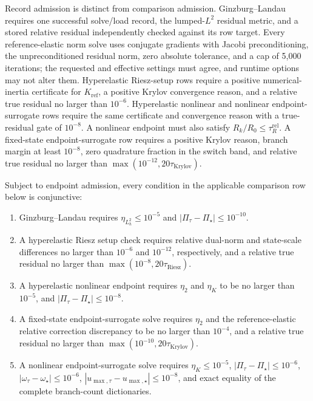 Record admission is distinct from comparison admission. Ginzburg--Landau
requires one successful solve/load record, the lumped-$L^2$ residual metric,
and a stored relative residual independently checked against its row target.
Every
reference-elastic norm solve uses conjugate gradients with Jacobi
preconditioning, the unpreconditioned residual norm, zero absolute tolerance,
and a cap of 5,000 iterations; the requested and effective settings must agree,
and runtime options may not alter them. Hyperelastic Riesz-setup rows require a
positive numerical-inertia certificate for $K_{\mathrm{ref}}$, a positive
Krylov convergence reason, and a relative true residual no larger than
$10^{-6}$. Hyperelastic nonlinear and nonlinear endpoint-surrogate rows require
the same certificate and convergence reason with a true-residual gate of
$10^{-8}$. A nonlinear endpoint must also satisfy
$R_k/R_0\leq\tau_R^{\mathrm{rel}}$. A fixed-state endpoint-surrogate row requires a positive
Krylov reason, branch margin at least $10^{-8}$, zero quadrature fraction in the
switch band, and relative true residual no larger than
$\max(10^{-12},20\tau_{\mathrm{Krylov}})$.

Subject to endpoint admission, every condition in the applicable comparison
row below is conjunctive:
\begin{enumerate}
  \item Ginzburg--Landau requires $\eta_{L_h^2}\leq10^{-5}$ and
        $|\Pi_\tau-\Pi_\star|\leq10^{-10}$.
  \item A hyperelastic Riesz setup check requires relative dual-norm and
        state-scale differences no larger than $10^{-6}$ and $10^{-12}$,
        respectively, and a relative true residual no larger than
        $\max(10^{-8},20\tau_{\mathrm{Riesz}})$.
  \item A hyperelastic nonlinear endpoint requires $\eta_2$ and $\eta_K$ to be
        no larger than $10^{-5}$,
        and $|\Pi_\tau-\Pi_\star|\leq10^{-8}$.
  \item A fixed-state endpoint-surrogate solve requires $\eta_2$ and the
        reference-elastic relative correction discrepancy to be no larger than
        $10^{-4}$, and a relative true residual no larger than
        $\max(10^{-10},20\tau_{\mathrm{Krylov}})$.
  \item A nonlinear endpoint-surrogate solve requires
        $\eta_K\leq10^{-5}$,
        $|\Pi_\tau-\Pi_\star|\leq10^{-6}$,
        $|\omega_\tau-\omega_\star|\leq10^{-6}$,
        $|u_{\max,\tau}-u_{\max,\star}|\leq10^{-8}$, and exact equality of
        the complete branch-count dictionaries.
\end{enumerate}

